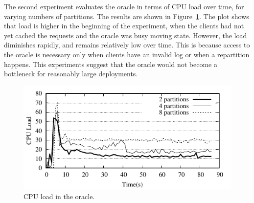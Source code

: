 The second experiment evaluates the oracle in terms of CPU load over
time, for varying numbers of partitions. The results are shown in
Figure~\ref{fig:cpu_oracle}. The plot shows that load is higher in the
beginning of the experiment, when the clients had not yet cached the
requests and the oracle was busy moving state. However, the load diminishes rapidly, and remains relatively
low over time. This is because access to the oracle is necessary only
when clients have an invalid log or when a repartition happens. This experiments
suggest that the oracle would not become a bottleneck for reasonably large
deployments.

\begin{figure}[ht]
	\includegraphics[width=\columnwidth]{figures/experiments/oracle-load}
	\caption{CPU load in the oracle.}
	\label{fig:cpu_oracle}
\end{figure}

